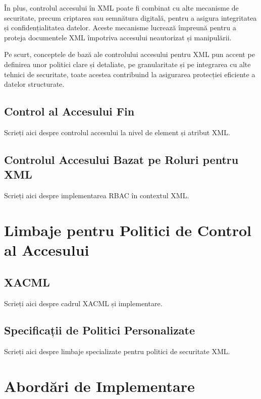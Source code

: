 \documentclass[runningheads]{llncs}
\begin{document}
\begin{spacing}{1.5}
În plus, controlul accesului în XML poate fi combinat cu alte mecanisme de securitate, precum criptarea sau semnătura digitală, pentru a asigura integritatea și confidențialitatea datelor. Aceste mecanisme lucrează împreună pentru a proteja documentele XML împotriva accesului neautorizat și manipulării.

Pe scurt, conceptele de bază ale controlului accesului pentru XML pun accent pe definirea unor politici clare și detaliate, pe granularitate și pe integrarea cu alte tehnici de securitate, toate acestea contribuind la asigurarea protecției eficiente a datelor structurate.



\subsection{Control al Accesului Fin}

Scrieți aici despre controlul accesului la nivel de element și atribut XML.



\subsection{Controlul Accesului Bazat pe Roluri pentru XML}

Scrieți aici despre implementarea RBAC în contextul XML.



\section{Limbaje pentru Politici de Control al Accesului}

\subsection{XACML}
Scrieți aici despre cadrul XACML și implementare.

\subsection{Specificații de Politici Personalizate}
Scrieți aici despre limbaje specializate pentru politici de securitate XML.

\section{Abordări de Implementare}


\end{spacing}
\end{document}
